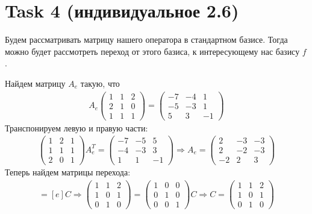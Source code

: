 \section{Task 4 (индивидуальное 2.6)}
Будем рассматривать матрицу нашего оператора в стандартном базисе. Тогда можно будет рассмотреть переход от этого базиса, к интересующему нас базису $f$.

Найдем матрицу $A_e$ такую, что
\begin{gather}
    A_e
    \begin{pmatrix}
        1 & 1 & 2 \\
        2 & 1 & 0 \\
        1 & 1 & 1
    \end{pmatrix} = 
    \begin{pmatrix}
        -7 & -4 &  1 \\
        -5 & -3 &  1 \\
         5 &  3 & -1
    \end{pmatrix}
\end{gather}
Транспонируем левую и правую части:
\begin{gather}
    \begin{pmatrix}
        1 & 2 & 1 \\
        1 & 1 & 1 \\
        2 & 0 & 1
    \end{pmatrix} A_e^T = 
    \begin{pmatrix}
        -7 & -5 &  5 \\
        -4 & -3 &  3 \\
         1 &  1 & -1
    \end{pmatrix} \Longrightarrow A_e = 
    \begin{pmatrix}
         2 & -3 & -3 \\
         2 & -2 & -3 \\
        -2 &  2 &  3
    \end{pmatrix}
\end{gather}
Теперь найдем матрицы перехода:
\begin{gather}
    [f] = [e]C \Longrightarrow
    \begin{pmatrix}
        1 & 1 & 2 \\
        1 & 0 & 1 \\
        0 & 1 & 0
    \end{pmatrix} = 
    \begin{pmatrix}
        1 & 0 & 0 \\
        0 & 1 & 0 \\
        0 & 0 & 1    
    \end{pmatrix} C \Longrightarrow
    C = 
    \begin{pmatrix}
        1 & 1 & 2 \\
        1 & 0 & 1 \\
        0 & 1 & 0
    \end{pmatrix}
\end{gather}
